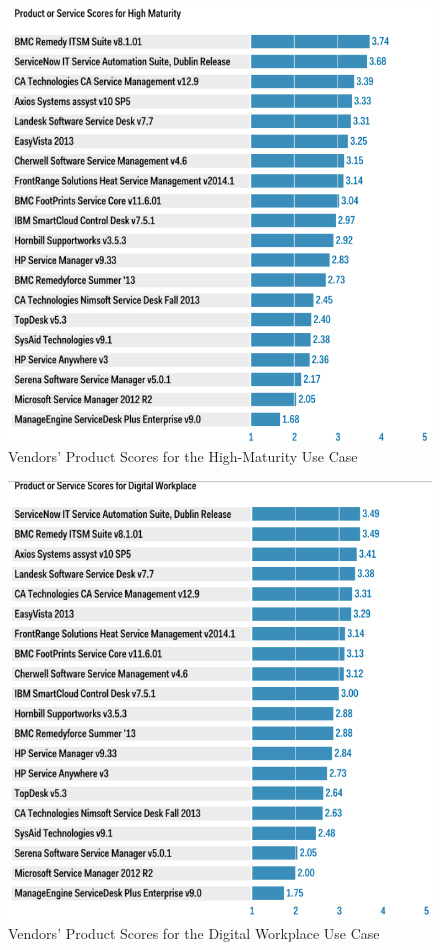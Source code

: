 \begin{figure}
\centering
\includegraphics{img/HighScores.png}
\caption{Vendors' Product Scores for the High-Maturity Use Case}
\end{figure}

\begin{figure}
\centering
\includegraphics{img/DigitalWorkplaceScores.png}
\caption{Vendors' Product Scores for the Digital Workplace Use Case}
\end{figure}

